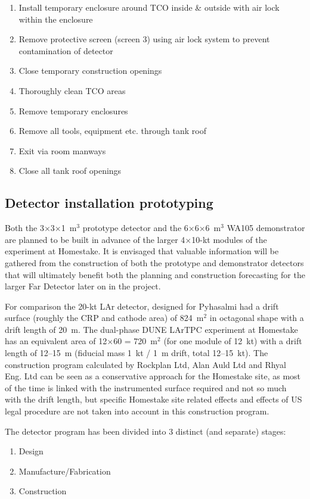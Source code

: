 \begin{enumerate}
\item{Install temporary enclosure around TCO inside \& outside with air lock within the enclosure}
\item{ Remove protective screen (screen 3) using air lock system to prevent contamination of detector}
\item{Close temporary construction openings}
\item{Thoroughly clean TCO areas}
\item{Remove temporary enclosures}
\item{Remove all tools, equipment etc. through tank roof}
\item{Exit via room manways}
\item{Close all tank roof openings}
\end{enumerate}

\subsection{Detector installation prototyping}

Both the 3$\times$3$\times$1~m$^3$ prototype detector and the
6$\times$6$\times$6~m$^3$ WA105 demonstrator are planned to be built in
advance of the larger 4$\times$10-kt modules of the experiment at
Homestake. It is envisaged that valuable information will be gathered
from the construction of both the prototype and demonstrator detectors
that will ultimately benefit both the planning and construction
forecasting for the larger Far Detector later on in the project.

For comparison the 20-kt LAr detector, designed for Pyhasalmi had a
drift surface (roughly the CRP and cathode area) of 824~m$^2$ in
octagonal shape with a drift length of 20~m. The dual-phase DUNE
LArTPC experiment at Homestake has an equivalent area of 12$\times$60 =
720~m$^2$ (for one module of 12~kt) with a drift length of 12--15~m
(fiducial mass 1~kt / 1~m drift, total 12--15~kt). The construction
program calculated by Rockplan Ltd, Alan Auld Ltd and Rhyal Eng. Ltd
can be seen as a conservative approach for the Homestake site, as most
of the time is linked with the instrumented surface required and not
so much with the drift length, but specific Homestake site related
effects and effects of US legal procedure are not taken into account
in this construction program.

The detector program has been divided into 3 distinct (and separate)
stages:
\begin{enumerate}
\item{Design}
\item{Manufacture/Fabrication} 
\item{Construction}
\end{enumerate}  

